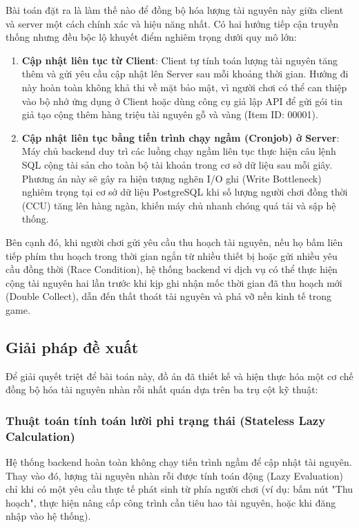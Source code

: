 \documentclass[../Project.tex]{subfiles}
\begin{document}
Bài toán đặt ra là làm thế nào để đồng bộ hóa lượng tài nguyên này giữa client và server một cách chính xác và hiệu năng nhất. Có hai hướng tiếp cận truyền thống nhưng đều bộc lộ khuyết điểm nghiêm trọng dưới quy mô lớn:
\begin{enumerate}
    \item \textbf{Cập nhật liên tục từ Client}: Client tự tính toán lượng tài nguyên tăng thêm và gửi yêu cầu cập nhật lên Server sau mỗi khoảng thời gian. Hướng đi này hoàn toàn không khả thi về mặt bảo mật, vì người chơi có thể can thiệp vào bộ nhớ ứng dụng ở Client hoặc dùng công cụ giả lập API để gửi gói tin giả tạo cộng thêm hàng triệu tài nguyên gỗ và vàng (Item ID: 00001).
    \item \textbf{Cập nhật liên tục bằng tiến trình chạy ngầm (Cronjob) ở Server}: Máy chủ backend duy trì các luồng chạy ngầm liên tục thực hiện câu lệnh SQL cộng tài sản cho toàn bộ tài khoản trong cơ sở dữ liệu sau mỗi giây. Phương án này sẽ gây ra hiện tượng nghẽn I/O ghi (Write Bottleneck) nghiêm trọng tại cơ sở dữ liệu PostgreSQL khi số lượng người chơi đồng thời (CCU) tăng lên hàng ngàn, khiến máy chủ nhanh chóng quá tải và sập hệ thống.
\end{enumerate}

Bên cạnh đó, khi người chơi gửi yêu cầu thu hoạch tài nguyên, nếu họ bấm liên tiếp phím thu hoạch trong thời gian ngắn từ nhiều thiết bị hoặc gửi nhiều yêu cầu đồng thời (Race Condition), hệ thống backend vi dịch vụ có thể thực hiện cộng tài nguyên hai lần trước khi kịp ghi nhận mốc thời gian đã thu hoạch mới (Double Collect), dẫn đến thất thoát tài nguyên và phá vỡ nền kinh tế trong game.

\subsection{Giải pháp đề xuất}
Để giải quyết triệt để bài toán này, đồ án đã thiết kế và hiện thực hóa một cơ chế đồng bộ hóa tài nguyên nhàn rỗi nhất quán dựa trên ba trụ cột kỹ thuật:

\subsubsection{Thuật toán tính toán lười phi trạng thái (Stateless Lazy Calculation)}
Hệ thống backend hoàn toàn không chạy tiến trình ngầm để cập nhật tài nguyên. Thay vào đó, lượng tài nguyên nhàn rỗi được tính toán động (Lazy Evaluation) chỉ khi có một yêu cầu thực tế phát sinh từ phía người chơi (ví dụ: bấm nút "Thu hoạch", thực hiện nâng cấp công trình cần tiêu hao tài nguyên, hoặc khi đăng nhập vào hệ thống).
\end{document}
